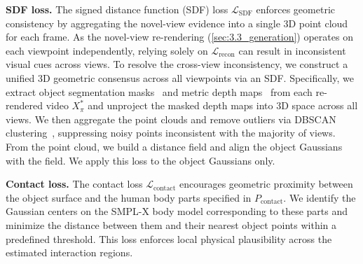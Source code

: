 \noindent\textbf{SDF loss.}
The signed distance function (SDF) loss $\mathcal{L}_{\text{SDF}}$ enforces geometric consistency by aggregating the novel-view evidence into a single 3D point cloud for each frame.
As the novel-view re-rendering (\cref{sec:3.3_generation}) operates on each viewpoint independently, relying solely on $\mathcal{L}_{\text{recon}}$ can result in inconsistent visual cues across views.
To resolve the cross-view inconsistency, we construct a unified 3D geometric consensus across all viewpoints via an SDF.
Specifically, we extract object segmentation masks~\cite{ravi2025sam} and metric depth maps~\cite{piccinelli2024unidepth} from each re-rendered video $X^{*}_{\pi}$ and unproject the masked depth maps into 3D space across all views.
We then aggregate the point clouds and remove outliers via DBSCAN clustering~\cite{ester1996density}, suppressing noisy points inconsistent with the majority of views.
From the point cloud, we build a distance field and align the object Gaussians with the field.
We apply this loss to the object Gaussians only.


\noindent\textbf{Contact loss.}
The contact loss $\mathcal{L}_{\text{contact}}$ encourages geometric proximity between the object surface and the human body parts specified in $P_{\text{contact}}$.
We identify the Gaussian centers on the SMPL-X body model corresponding to these parts and minimize the distance between them and their nearest object points within a predefined threshold.
This loss enforces local physical plausibility across the estimated interaction regions.





